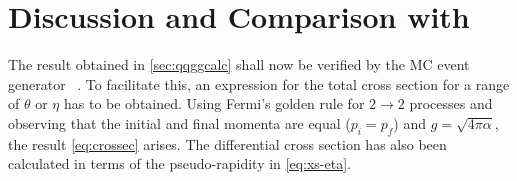 \section{Discussion and Comparison with \sherpa}%
\label{sec:compsher}

The result obtained in \cref{sec:qqggcalc} shall now be verified by
the MC event generator \sherpa{}~\cite{Gleisberg:2008ta}. To
facilitate this, an expression for the total cross section for a range
of \(\theta\) or \(\eta\) has to be obtained. Using Fermi's golden
rule for \(2\rightarrow 2\) processes and observing that the initial
and final momenta are equal (\(p_i=p_f\)) and \(g=\sqrt{4\pi\alpha}\),
the result \cref{eq:crossec} arises. The differential cross section
has also been calculated in terms of the pseudo-rapidity in
\cref{eq:xs-eta}.

